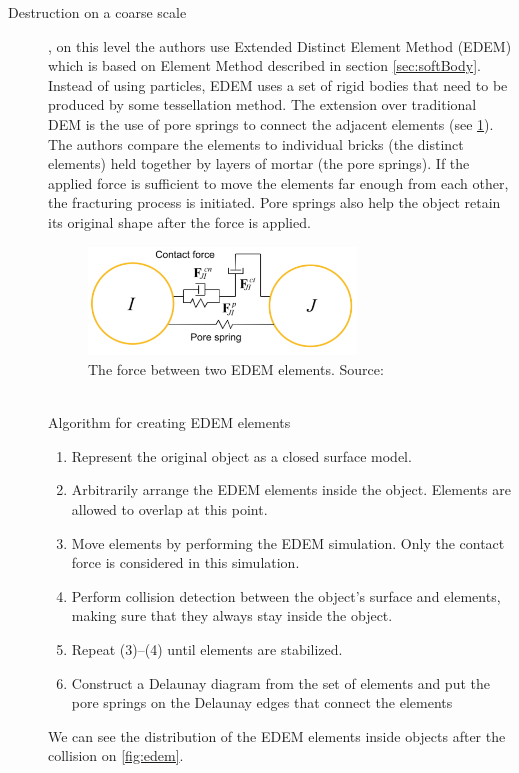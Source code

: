 \begin{description}
\item[Destruction on a coarse scale], on this level the authors use Extended Distinct Element Method (EDEM) which is based on Element Method described in section \ref{sec:softBody}. Instead of using particles, EDEM uses a set of rigid bodies that need to be produced by some tessellation method. The extension over traditional DEM is the use of pore springs to connect the adjacent elements (see \cref{fig:spring}). The authors compare the elements to individual bricks (the distinct elements) held together by layers of mortar (the pore springs). If the applied force is sufficient to move the elements far enough from each other, the fracturing process is initiated. Pore springs also help the object retain its original shape after the force is applied. 
\begin{figure}[t]
        \centering
        \includegraphics[width=0.7\textwidth]{img/spring}
        \caption{The force between two EDEM elements. Source: \citet{edem}}
        \label{fig:spring}
\end{figure}
\\Algorithm for creating EDEM elements
\begin{enumerate}
\item Represent the original object as a closed surface model.
\item Arbitrarily arrange the EDEM elements inside the object.
Elements are allowed to overlap at this point.
\item Move elements by performing the EDEM simulation. Only the contact force is considered in this simulation.
\item Perform collision detection between the object’s surface
and elements, making sure that they always
stay inside the object.
\item Repeat (3)–(4) until elements are stabilized.
\item Construct a Delaunay diagram from the set of elements
and put the pore springs on the Delaunay edges that connect
the elements
\end{enumerate}
We can see the distribution of the EDEM elements inside objects after the collision on \cref{fig:edem}.


\end{description}
